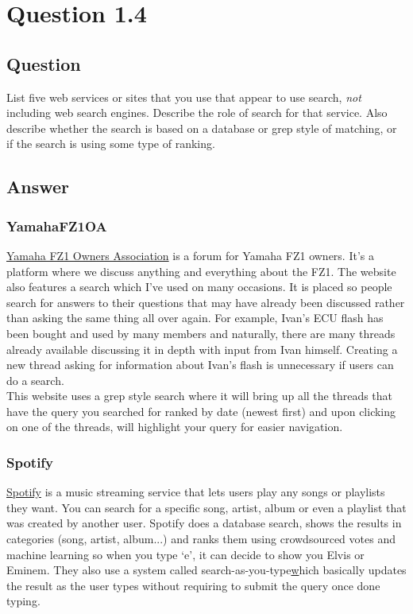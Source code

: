 \documentclass[10pt,letterpaper,bibliography=totocnumbered]{scrartcl}
\begin{document}
\section{Question 1.4}
\subsection{Question}
List five web services or sites that you use that appear to use search, \textit{not} including
web search engines. Describe the role of search for that service. Also describe
whether the search is based on a database or grep style of matching, or if the search
is using some type of ranking.
\subsection{Answer}
\subsubsection{YamahaFZ1OA}
\href{www.yamahafz1oa.com}{Yamaha FZ1 Owners Association} is a forum for Yamaha FZ1 owners. It's a platform where we discuss anything and everything about the FZ1. The website also features a search which I've used on many occasions. It is placed so people search for answers to their questions that may have already been discussed rather than asking the same thing all over again. For example, Ivan's ECU flash has been bought and used by many members and naturally, there are many threads already available discussing it in depth with input from Ivan himself. Creating a new thread asking for information about Ivan's flash is unnecessary if users can do a search. \\

This website uses a grep style search where it will bring up all the threads that have the query you searched for ranked by date (newest first) and upon clicking on one of the threads, will highlight your query for easier navigation.

\subsubsection{Spotify}
\href{www.spotify.com}{Spotify} is a music streaming service that lets users play any songs or playlists they want. You can search for a specific song, artist, album or even a playlist that was created by another user. Spotify does a database search, shows the results in categories (song, artist, album...) and ranks them using crowdsourced votes and machine learning so when you type `e', it can decide to show you Elvis or Eminem. They also use a system called search-as-you-type\cite{search-as-you-type}\href{https://www.youtube.com/watch?v=IFRKLBuuXCA} which basically updates the result as the user types without requiring to submit the query once done typing. 
\end{document}
